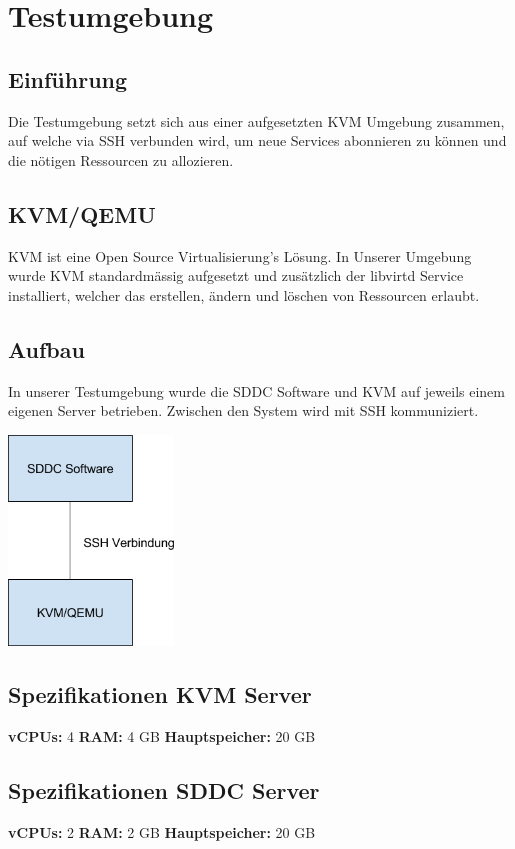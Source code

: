 \chapter{Testumgebung}

\section{Einführung}

Die Testumgebung setzt sich aus einer aufgesetzten KVM Umgebung zusammen, auf 
welche via SSH verbunden wird, um neue Services abonnieren zu können und die 
nötigen Ressourcen zu allozieren.

\section{KVM/QEMU}

KVM ist eine Open Source Virtualisierung's Lösung.
In Unserer Umgebung wurde KVM standardmässig aufgesetzt und zusätzlich der 
libvirtd Service installiert, welcher das erstellen, ändern und löschen von 
Ressourcen erlaubt.

\section{Aufbau}

In unserer Testumgebung wurde die SDDC Software und KVM auf jeweils einem eigenen Server betrieben.
Zwischen den System wird mit SSH kommuniziert.
\begin{center}
\includegraphics[width=0.33\textwidth]{./11_Appendix/images/kvm}
\end{center}

\section{Spezifikationen KVM Server}

\textbf{vCPUs:} 4
\textbf{RAM:} 4 GB
\textbf{Hauptspeicher:} 20 GB

\section{Spezifikationen SDDC Server}

\textbf{vCPUs:} 2
\textbf{RAM:} 2 GB
\textbf{Hauptspeicher:} 20 GB